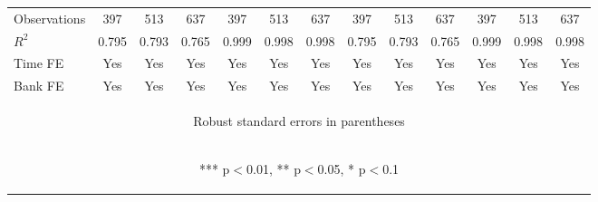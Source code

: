 \documentclass[]{article}
\begin{document}
\begin{center}
\begin{tabular}{lcccccccccccc}
Observations & 397 & 513 & 637 & 397 & 513 & 637 & 397 & 513 & 637 & 397 & 513 & 637 \\
$R^2$ & 0.795 & 0.793 & 0.765 & 0.999 & 0.998 & 0.998 & 0.795 & 0.793 & 0.765 & 0.999 & 0.998 & 0.998 \\
Time FE & Yes & Yes & Yes & Yes & Yes & Yes & Yes & Yes & Yes & Yes & Yes & Yes \\
 Bank FE & Yes & Yes & Yes & Yes & Yes & Yes & Yes & Yes & Yes & Yes & Yes & Yes \\ \hline
\multicolumn{13}{c}{\begin{footnotesize} Robust standard errors in parentheses\end{footnotesize}} \\
\multicolumn{13}{c}{\begin{footnotesize} *** p$<$0.01, ** p$<$0.05, * p$<$0.1\end{footnotesize}} \\
\end{tabular}
\end{center}
\end{document}
